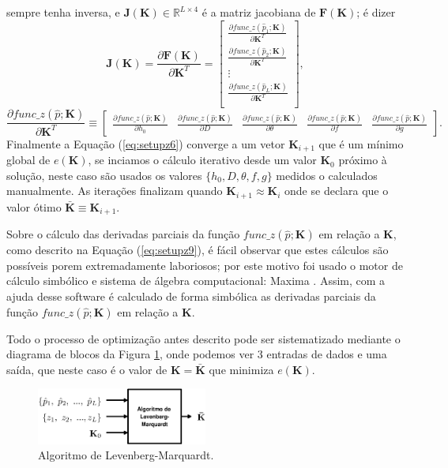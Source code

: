 \documentclass[a4paper, 12pt]{article}
\begin{document}
sempre tenha inversa, e 
 $\mathbf{J}(\mathbf{K})\in \mathbb{R}^{L\times 4}$ é a matriz jacobiana 
\cite[pp. 130]{zhang2017matrix} de $\mathbf{F}(\mathbf{K})$; é dizer
\begin{equation}
\mathbf{J}(\mathbf{K})=\frac{\partial \mathbf{F}(\mathbf{K})}{\partial \mathbf{K}^T}=
\begin{bmatrix}
\frac{\partial func\_z(\hat{p}_1;\mathbf{K})}{\partial \mathbf{K}^T}\\
\frac{\partial func\_z(\hat{p}_2;\mathbf{K})}{\partial \mathbf{K}^T}\\
\vdots\\
\frac{\partial func\_z(\hat{p}_L;\mathbf{K})}{\partial \mathbf{K}^T}\\
\end{bmatrix},
\end{equation}
\begin{equation}\label{eq:setupz9}
\frac{\partial func\_z(\hat{p};\mathbf{K})}{\partial \mathbf{K}^T}\equiv 
\begin{bmatrix}
\frac{\partial func\_z(\hat{p};\mathbf{K})}{\partial h_0} &
\frac{\partial func\_z(\hat{p};\mathbf{K})}{\partial D} &
\frac{\partial func\_z(\hat{p};\mathbf{K})}{\partial \theta} &
\frac{\partial func\_z(\hat{p};\mathbf{K})}{\partial f} &
\frac{\partial func\_z(\hat{p};\mathbf{K})}{\partial g}
\end{bmatrix}.
\end{equation}
Finalmente a Equação (\ref{eq:setupz6}) converge a um vetor $\mathbf{K}_{i+1}$ que é um mínimo global 
de $e\left(\mathbf{K}\right)$, se inciamos o cálculo iterativo desde 
um valor $\mathbf{K}_0$ próximo à solução, neste caso são usados os valores
$\{h_0,D,\theta,f,g\}$ medidos o calculados manualmente. 
As iterações finalizam quando $\mathbf{K}_{i+1}\approx \mathbf{K}_{i}$
onde se declara que o valor ótimo $\mathbf{\bar{K}}\equiv \mathbf{K}_{i+1}$.

Sobre o cálculo das derivadas parciais da função
$func\_z(\hat{p};\mathbf{K})$ em relação a $\mathbf{K}$, como
descrito na Equação (\ref{eq:setupz9}), é fácil observar que estes cálculos
são possíveis porem extremadamente laboriosos;
por este motivo foi usado o motor de cálculo simbólico  
e  sistema de álgebra computacional: Maxima \cite{santos2009introduccao}.
Assim, com a ajuda desse software é calculado de forma simbólica
as derivadas parciais da função $func\_z(\hat{p};\mathbf{K})$ em relação a $\mathbf{K}$.

Todo o processo de optimização antes descrito pode ser sistematizado mediante o diagrama de blocos 
da Figura \ref{fig:Diagrama6}, onde podemos ver 3 entradas de dados e uma saída,
que neste caso é o valor de $\mathbf{K}=\mathbf{\bar{K}}$ que minimiza $e\left(\mathbf{K}\right)$.
\begin{figure}[!h]
     \centering
         \includegraphics[width=0.5\textwidth]{Diagrama6.eps}
\caption{Algoritmo de Levenberg-Marquardt.}
\label{fig:Diagrama6}
\end{figure}
\end{document}
